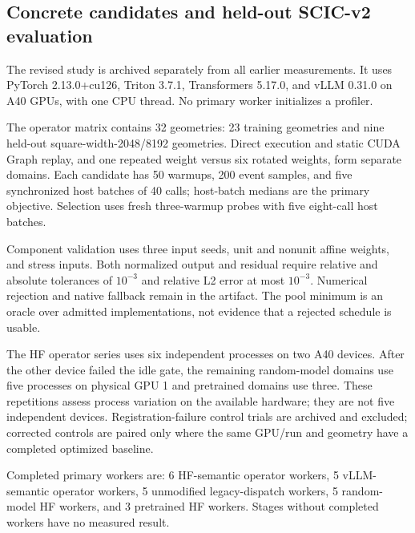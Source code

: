 \subsection{Concrete candidates and held-out SCIC-v2 evaluation}

\label{sec:v2-evaluation}

The revised study is archived separately from all earlier measurements. It uses PyTorch 2.13.0+cu126, Triton 3.7.1, Transformers 5.17.0, and vLLM 0.31.0 on A40 GPUs, with one CPU thread. No primary worker initializes a profiler.

The operator matrix contains 32 geometries: 23 training geometries and nine held-out square-width-2048/8192 geometries. Direct execution and static CUDA Graph replay, and one repeated weight versus six rotated weights, form separate domains. Each candidate has 50 warmups, 200 event samples, and five synchronized host batches of 40 calls; host-batch medians are the primary objective. Selection uses fresh three-warmup probes with five eight-call host batches.

Component validation uses three input seeds, unit and nonunit affine weights, and stress inputs. Both normalized output and residual require relative and absolute tolerances of $10^{-3}$ and relative L2 error at most $10^{-3}$. Numerical rejection and native fallback remain in the artifact. The pool minimum is an oracle over admitted implementations, not evidence that a rejected schedule is usable.

The HF operator series uses six independent processes on two A40 devices. After the other device failed the idle gate, the remaining random-model domains use five processes on physical GPU 1 and pretrained domains use three. These repetitions assess process variation on the available hardware; they are not five independent devices. Registration-failure control trials are archived and excluded; corrected controls are paired only where the same GPU/run and geometry have a completed optimized baseline.

Completed primary workers are: 6 HF-semantic operator workers, 5 vLLM-semantic operator workers, 5 unmodified legacy-dispatch workers, 5 random-model HF workers, and 3 pretrained HF workers. Stages without completed workers have no measured result.

